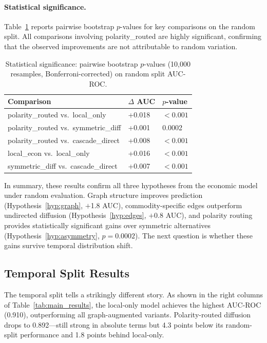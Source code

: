 \documentclass[preprint,12pt,authoryear]{elsarticle}
\begin{document}
\paragraph{Statistical significance.} Table~\ref{tab:significance} reports pairwise bootstrap $p$-values for key comparisons on the random split. All comparisons involving polarity\_routed are highly significant, confirming that the observed improvements are not attributable to random variation.

\begin{table}[t]
\centering
\caption{Statistical significance: pairwise bootstrap $p$-values (10,000 resamples, Bonferroni-corrected) on random split AUC-ROC.}
\label{tab:significance}
\begin{tabular}{@{}lll@{}}
\toprule
\textbf{Comparison} & \textbf{$\Delta$ AUC} & \textbf{$p$-value} \\
\midrule
polarity\_routed vs.\ local\_only      & +0.018 & $< 0.001$ \\
polarity\_routed vs.\ symmetric\_diff  & +0.001 & 0.0002 \\
polarity\_routed vs.\ cascade\_direct  & +0.008 & $< 0.001$ \\
local\_econ vs.\ local\_only           & +0.016 & $< 0.001$ \\
symmetric\_diff vs.\ cascade\_direct   & +0.007 & $< 0.001$ \\
\bottomrule
\end{tabular}
\end{table}

In summary, these results confirm all three hypotheses from the economic model under random evaluation. Graph structure improves prediction (Hypothesis~\ref{hyp:graph}, $+$1.8 AUC), commodity-specific edges outperform undirected diffusion (Hypothesis~\ref{hyp:edges}, $+$0.8 AUC), and polarity routing provides statistically significant gains over symmetric alternatives (Hypothesis~\ref{hyp:asymmetry}, $p = 0.0002$). The next question is whether these gains survive temporal distribution shift.

\subsection{Temporal Split Results}
\label{sec:temporal_results}

The temporal split tells a strikingly different story. As shown in the right columns of Table~\ref{tab:main_results}, the local-only model achieves the highest AUC-ROC (0.910), outperforming all graph-augmented variants. Polarity-routed diffusion drops to 0.892---still strong in absolute terms but 4.3 points below its random-split performance and 1.8 points behind local-only.
\end{document}
